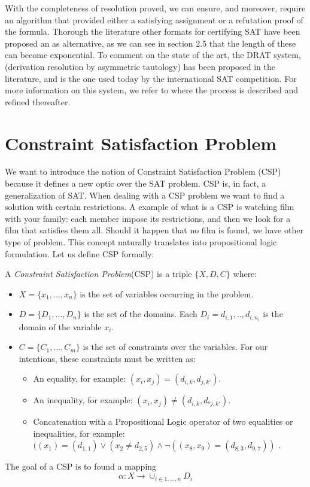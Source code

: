 With the completeness of resolution proved, we can ensure, and moreover, require an algorithm that provided either a satisfying assignment or a refutation proof of the formula. Thorough the literature other formats for certifying SAT have been proposed an as alternative, as we can see in section 2.5 \cite{schoning2013satisfiability} that the length of these can become exponential.  To comment on the state of the art, the DRAT system, (derivation resolution by asymmetric tautology) has been proposed in the literature, and is the one used today by the international SAT competition. For more information on this system, we refer to \cite{lammich2020efficient} where the process is described and refined thereafter. 



\section{Constraint Satisfaction Problem}
  
We want to introduce the notion of Constraint Satisfaction Problem (CSP) because it defines a new optic over the SAT problem. CSP is, in fact, a generalization of SAT. When dealing with a CSP problem we want to find a solution with certain restrictions. A example of what is a CSP is watching film with your family: each member impose its restrictions, and then we look for a film that satisfies them all. Should it happen that no film is found, we have other type of problem. This concept naturally translates into propositional logic formulation. Let us define CSP formally:

\begin{definition}
  A \emph{Constraint Satisfaction Problem}(CSP) is a triple $\{X,D,C\}$ where:
  \begin{itemize}
  \item $X=\{x_1,...,x_n\}$ is the set of variables  occurring in the problem.
  \item $D=\{D_1,...,D_n\}$ is the set of the domains. Each $D_i={d_{i,1},..,d_{i,n_i}}$ is the domain of the variable $x_i$.
  \item $C=\{C_1,...,C_m\}$ is the set of constraints over the variables. For our intentions, these constraints must be written as:
    \begin{itemize}
    \item An equality, for example: $(x_i, x_j) = (d_{i,k}, d_{j,k'})$.
    \item An inequality, for example: $(x_i, x_j) \ne (d_{i,k}, d_{ºj,k'})$.
    \item Concatenation with a Propositional Logic operator of two equalities or inequalities, for example: $((x_1) = (d_{1,1}) \vee (x_2 \ne d_{2,5}) \wedge \neg((x_8,x_9) = (d_{8,3},d_{9,7}))$ .
    \end{itemize}
  \end{itemize}
\end{definition}
  The goal of a CSP is to found a mapping \[ \alpha:X\to \cup_{i\in 1,...,n} D_i\]
  
